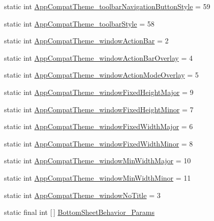 \begin{DoxyCompactItemize}
\item 
static int \hyperlink{classandroid_1_1support_1_1design_1_1R_1_1styleable_af3d0203e79964854fe14861e072e6ff3}{App\+Compat\+Theme\+\_\+toolbar\+Navigation\+Button\+Style} = 59
\item 
static int \hyperlink{classandroid_1_1support_1_1design_1_1R_1_1styleable_aee082e81065a0dcd55b2dac5cf28624e}{App\+Compat\+Theme\+\_\+toolbar\+Style} = 58
\item 
static int \hyperlink{classandroid_1_1support_1_1design_1_1R_1_1styleable_af0d7fc989412d347b42efaf6e07fb775}{App\+Compat\+Theme\+\_\+window\+Action\+Bar} = 2
\item 
static int \hyperlink{classandroid_1_1support_1_1design_1_1R_1_1styleable_a8ea8126eeb9bb872aeb7fdb94d4a4db9}{App\+Compat\+Theme\+\_\+window\+Action\+Bar\+Overlay} = 4
\item 
static int \hyperlink{classandroid_1_1support_1_1design_1_1R_1_1styleable_add8f8ab4f925ac3f15d7337d40a9ecd8}{App\+Compat\+Theme\+\_\+window\+Action\+Mode\+Overlay} = 5
\item 
static int \hyperlink{classandroid_1_1support_1_1design_1_1R_1_1styleable_adda8a0798f30bcf0b35dc5ca9c4e570a}{App\+Compat\+Theme\+\_\+window\+Fixed\+Height\+Major} = 9
\item 
static int \hyperlink{classandroid_1_1support_1_1design_1_1R_1_1styleable_a772ad7624fd50e19bc24adae7d61f335}{App\+Compat\+Theme\+\_\+window\+Fixed\+Height\+Minor} = 7
\item 
static int \hyperlink{classandroid_1_1support_1_1design_1_1R_1_1styleable_ab12b360d277ad1c88a3ee93ff645a047}{App\+Compat\+Theme\+\_\+window\+Fixed\+Width\+Major} = 6
\item 
static int \hyperlink{classandroid_1_1support_1_1design_1_1R_1_1styleable_ab0a6460ce03febb5815a97617555e4ac}{App\+Compat\+Theme\+\_\+window\+Fixed\+Width\+Minor} = 8
\item 
static int \hyperlink{classandroid_1_1support_1_1design_1_1R_1_1styleable_a15a4daeba04d2f8277a443992fa1d153}{App\+Compat\+Theme\+\_\+window\+Min\+Width\+Major} = 10
\item 
static int \hyperlink{classandroid_1_1support_1_1design_1_1R_1_1styleable_a021b9cf9e84f6d782b685e0d9a05866a}{App\+Compat\+Theme\+\_\+window\+Min\+Width\+Minor} = 11
\item 
static int \hyperlink{classandroid_1_1support_1_1design_1_1R_1_1styleable_a81be05150eed15a8c4c447e2e4871635}{App\+Compat\+Theme\+\_\+window\+No\+Title} = 3
\item 
static final int \mbox{[}$\,$\mbox{]} \hyperlink{classandroid_1_1support_1_1design_1_1R_1_1styleable_a1eaee76086f549bf3ccdc756b449ddd4}{Bottom\+Sheet\+Behavior\+\_\+\+Params}

\end{DoxyCompactItemize}
